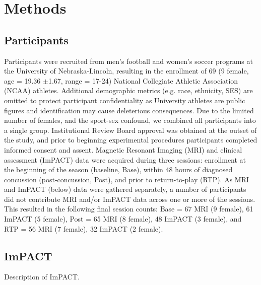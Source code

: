 \documentclass[12pt]{article}
\begin{document}


\section{Methods}
\label{sec:meth}

\subsection{Participants}
\label{ssec:meth-part}
Participants were recruited from men's football and women's soccer programs at the University of Nebraska-Lincoln, resulting in the enrollment of 69 (9 female, age = 19.36 $\pm$1.67, range = 17-24) National Collegiate Athletic Association (NCAA) athletes. Additional demographic metrics (e.g. race, ethnicity, SES) are omitted to protect participant confidentiality as University athletes are public figures and identification may cause deleterious consequences. Due to the limited number of females, and the sport-sex confound, we combined all participants into a single group. Institutional Review Board approval was obtained at the outset of the study, and prior to beginning experimental procedures participants completed informed consent and assent. Magnetic Resonant Imaging (MRI) and clinical assessment (ImPACT) data were acquired during three sessions: enrollment at the beginning of the season (baseline, Base), within 48 hours of diagnosed concussion (post-concussion, Post), and prior to return-to-play (RTP). As MRI and ImPACT (below) data were gathered separately, a number of participants did not contribute MRI and/or ImPACT data across one or more of the sessions. This resulted in the following final session counts: Base = 67 MRI (9 female), 61 ImPACT (5 female), Post = 65 MRI (8 female), 48 ImPACT (3 female), and RTP = 56 MRI (7 female), 32 ImPACT (2 female).


\subsection{ImPACT}
\label{ssec:meth-imp}
Description of ImPACT.

\end{document}
